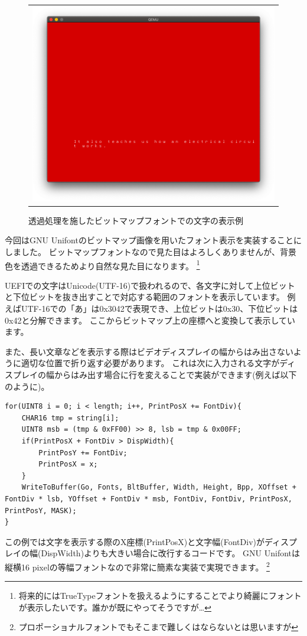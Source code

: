 \documentclass[10pt,b5paper,twoside,openany]{ltjsbook}
\begin{document}
\begin{figure}[H]
\begin{tabular}{c}
\begin{minipage}{0.5\hsize}
            \includegraphics[scale=0.22]{pic/screenshot.png}
            \caption{透過処理を施したビットマップフォントでの文字の表示例}
            \label{fig:bitmapfont}
        \end{minipage}
    \end{tabular}  
\end{figure}
今回はGNU Unifontのビットマップ画像を用いたフォント表示を実装することにしました。
ビットマップフォントなので見た目はよろしくありませんが、背景色を透過できるためより自然な見た目になります。
\footnote{将来的にはTrueTypeフォントを扱えるようにすることでより綺麗にフォントが表示したいです。誰かが既にやってそうですが…}

UEFIでの文字はUnicode(UTF-16)で扱われるので、各文字に対して上位ビットと下位ビットを抜き出すことで対応する範囲のフォントを表示しています。
例えばUTF-16での「あ」は0x3042で表現でき、上位ビットは0x30、下位ビットは0x42と分解できます。
ここからビットマップ上の座標へと変換して表示しています。

また、長い文章などを表示する際はビデオディスプレイの幅からはみ出さないように適切な位置で折り返す必要があります。
これは次に入力される文字がディスプレイの幅からはみ出す場合に行を変えることで実装ができます(例えば以下のように)。
\begin{lstlisting}[style=customC,caption=Wrap around process,label=prog:wraparound]
for(UINT8 i = 0; i < length; i++, PrintPosX += FontDiv){
    CHAR16 tmp = string[i];
    UINT8 msb = (tmp & 0xFF00) >> 8, lsb = tmp & 0x00FF;
    if(PrintPosX + FontDiv > DispWidth){
        PrintPosY += FontDiv;
        PrintPosX = x;
    }
    WriteToBuffer(Go, Fonts, BltBuffer, Width, Height, Bpp, XOffset + FontDiv * lsb, YOffset + FontDiv * msb, FontDiv, FontDiv, PrintPosX, PrintPosY, MASK);
}
\end{lstlisting}
この例では文字を表示する際のX座標(PrintPosX)と文字幅(FontDiv)がディスプレイの幅(DispWidth)よりも大きい場合に改行するコードです。
GNU Unifontは縦横16 pixelの等幅フォントなので非常に簡素な実装で実現できます。
\footnote{プロポーショナルフォントでもそこまで難しくはならないとは思いますが}
\end{document}
